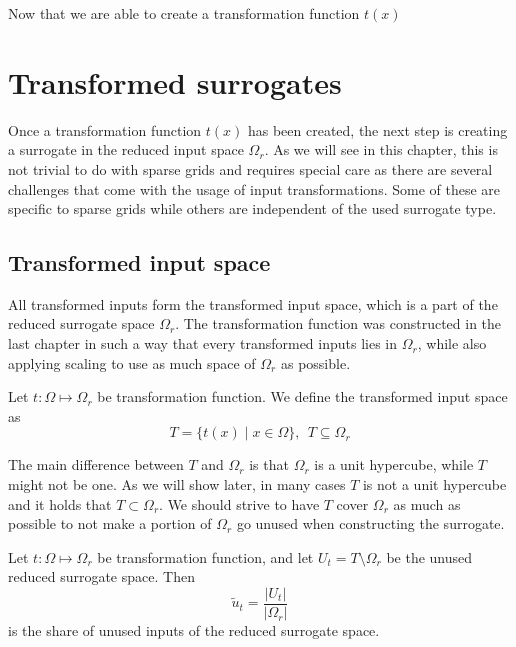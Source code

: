 \documentclass[
  a4paper,  %
  twoside,  %
  bibliography=totoc,
  headsepline,
  cleardoublepage=empty,
  parskip=half,
  draft=false
]{scrbook}
\begin{document}
Now that we are able to create a transformation function $t(x)$

\chapter{Transformed surrogates}

Once a transformation function $t(x)$ has been created, the next step is creating a surrogate in the reduced input space $\Omega_r$.
As we will see in this chapter, this is not trivial to do with sparse grids and requires special care as there are several challenges that come with the usage of input transformations.
Some of these are specific to sparse grids while others are independent of the used surrogate type.


\section{Transformed input space}

All transformed inputs form the transformed input space, which is a part of the reduced surrogate space $\Omega_r$.
The transformation function was constructed in the last chapter in such a way that every transformed inputs lies in $\Omega_r$, while also applying scaling to use as much space of $\Omega_r$ as possible.

\begin{definition}
Let $t \colon \Omega \mapsto \Omega_r$ be transformation function.
We define the transformed input space as
\begin{equation}
T=\{t(x) \mid x \in\Omega\}, ~~ T \subseteq \Omega_r
\end{equation}
\end{definition}

The main difference between $T$ and $\Omega_r$ is that $\Omega_r$ is a unit hypercube, while $T$ might not be one.
As we will show later, in many cases $T$ is not a unit hypercube and it holds that $T \subset \Omega_r$.
We should strive to have $T$ cover $\Omega_r$ as much as possible to not make a portion of $\Omega_r$ go unused when constructing the surrogate.

\begin{definition}
Let $t \colon \Omega \mapsto \Omega_r$ be transformation function, and let $U_t=T \setminus \Omega_r$ be the unused reduced surrogate space.
Then
\begin{equation}
\tilde{u}_t=\frac{|U_t|}{|\Omega_r|}
\end{equation}
is the share of unused inputs of the reduced surrogate space.
\end{definition}
\end{document}
